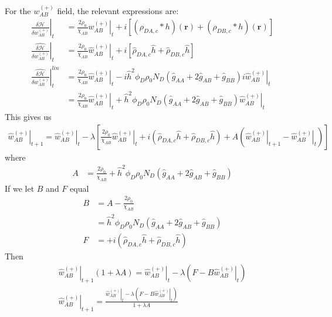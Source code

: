 \documentclass{article}
\begin{document}
For the $w_{AB}^{(+)}$ field, the relevant expressions are:
\begin{align*}
  \left. \frac{\delta \mathcal{H}}{\delta  w_{AB}^{(+)} } \right|_t &=
    \frac{2\rho_0}{\chi_{AB}} \left. w_{AB}^{(+)} \right|_t
    + i [ (\rho_{DA,c} \ast h)(\mathbf{r})
          + (\rho_{DB,c} \ast h)(\mathbf{r}) ] \\
    \left. \hat{\frac{\delta \mathcal{H}}{\delta w_{AB}^{(+)}}} \right|_t &=
    \frac{2\rho_0}{\chi_{AB}} \left. \hat{w}_{AB}^{(+)} \right|_t
    + i [ \hat{\rho}_{DA,c} \hat{h}
          + \hat{\rho}_{DB,c} \hat{h} ] \\
  \left. \hat{\frac{\delta \mathcal{H}}{\delta w_{AB}^{(+)}}} \right| ^{lin}_t &=
    \frac{2\rho_0}{\chi_{AB}} \left. \hat{w}_{AB}^{(+)} \right|_t
    - i \hat{h}^2 \phi_D \rho_0 N_D
      (\hat{g}_{AA} + 2 \hat{g}_{AB} + \hat{g}_{BB}) i \left.
        \hat{w}_{AB}^{(+)} \right|_t \\
  &= \frac{2\rho_0}{\chi_{AB}} \left. \hat{w}_{AB}^{(+)} \right|_t
    + \hat{h}^2 \phi_D \rho_0 N_D
      (\hat{g}_{AA} + 2 \hat{g}_{AB} + \hat{g}_{BB})
        \left. \hat{w}_{AB}^{(+)} \right|_t
\end{align*}
This gives us
\begin{align*}
  \left. \hat{w}_{AB}^{(+)} \right|_{t+1} =
    \left. \hat{w}_{AB}^{(+)} \right|_t - \lambda \left[
      \frac{2\rho_0}{\chi_{AB}} \left. \hat{w}_{AB}^{(+)} \right|_t
      + i ( \hat{\rho}_{DA,c} \hat{h}
            + \hat{\rho}_{DB,c} \hat{h} )
      + A ( \left. \hat{w}_{AB}^{(+)} \right|_{t+1}
            - \left. \hat{w}_{AB}^{(+)} \right|_t)
    \right]
\end{align*}
where
\begin{align*}
  A &=
  \frac{2\rho_0}{\chi_{AB}}
      + \hat{h}^2 \phi_D \rho_0 N_D
        (\hat{g}_{AA} + 2 \hat{g}_{AB} + \hat{g}_{BB})
\end{align*}
If we let $B$ and $F$ equal
\begin{align*}
  B &= A - \frac{2\rho_0}{\chi_{AB}} \\
    &= \hat{h}^2 \phi_D \rho_0 N_D
        (\hat{g}_{AA} + 2 \hat{g}_{AB} + \hat{g}_{BB}) \\
  F &= + i ( \hat{\rho}_{DA,c} \hat{h}
            + \hat{\rho}_{DB,c} \hat{h} )
\end{align*}
Then
\begin{align*}
  \left. \hat{w}_{AB}^{(+)} \right|_{t+1} ( 1 + \lambda A ) =
    \left. \hat{w}_{AB}^{(+)} \right|_t
    - \lambda \left( F - B \left. \hat{w}_{AB}^{(+)} \right|_t \right) \\
  \left. \hat{w}_{AB}^{(+)} \right|_{t+1} =
  \frac{\left. \hat{w}_{AB}^{(+)} \right|_t - \lambda
          \left( F - B \left. \hat{w}_{AB}^{(+)} \right|_t \right)}
       {1 + \lambda A}
\end{align*}
\end{document}
